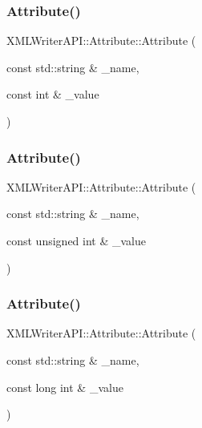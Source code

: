 \subsubsection{\texorpdfstring{Attribute()}{Attribute()}\hspace{0.1cm}{\footnotesize\ttfamily [3/44]}}
{\footnotesize\ttfamily X\+M\+L\+Writer\+A\+P\+I\+::\+Attribute\+::\+Attribute (\begin{DoxyParamCaption}\item[{const std\+::string \&}]{\+\_\+name,  }\item[{const int \&}]{\+\_\+value }\end{DoxyParamCaption})}

\mbox{\label{classXMLWriterAPI_1_1Attribute_ac147b4b673ad76a63fa60b5fba30ca24}} 
\subsubsection{\texorpdfstring{Attribute()}{Attribute()}\hspace{0.1cm}{\footnotesize\ttfamily [4/44]}}
{\footnotesize\ttfamily X\+M\+L\+Writer\+A\+P\+I\+::\+Attribute\+::\+Attribute (\begin{DoxyParamCaption}\item[{const std\+::string \&}]{\+\_\+name,  }\item[{const unsigned int \&}]{\+\_\+value }\end{DoxyParamCaption})}

\mbox{\label{classXMLWriterAPI_1_1Attribute_a2ed766103f87670031137dc458d55f7b}} 
\subsubsection{\texorpdfstring{Attribute()}{Attribute()}\hspace{0.1cm}{\footnotesize\ttfamily [5/44]}}
{\footnotesize\ttfamily X\+M\+L\+Writer\+A\+P\+I\+::\+Attribute\+::\+Attribute (\begin{DoxyParamCaption}\item[{const std\+::string \&}]{\+\_\+name,  }\item[{const long int \&}]{\+\_\+value }\end{DoxyParamCaption})}

